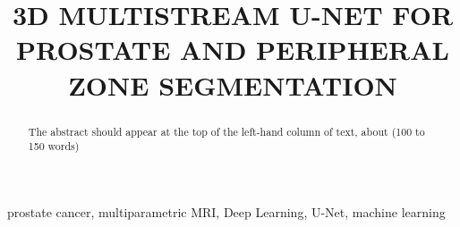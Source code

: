 \documentclass{article}
\title{3D MULTISTREAM U-NET FOR PROSTATE AND PERIPHERAL ZONE SEGMENTATION}
\begin{document}
\maketitle

\begin{abstract}
The abstract should appear at the top of the left-hand column of text, about
(100 to 150 words)
\end{abstract}

\begin{keywords}
prostate cancer, multiparametric MRI, Deep Learning, U-Net, machine learning
\end{keywords}








\end{document}
